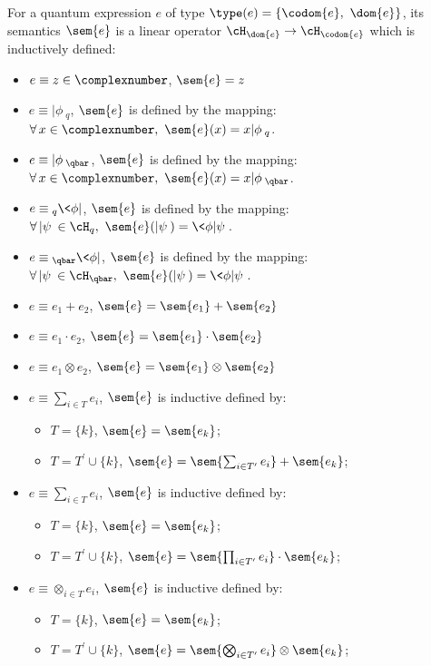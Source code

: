     \begin{definition}
        For a quantum expression $e$ of type $\type(e) = \{\codom{e},\ \dom{e}\}$, its semantics $\sem{e}$ is a linear operator $\cH_{\dom{e}}\rightarrow\cH_{\codom{e}}$ which is inductively defined:
        \begin{itemize}
            \item $e\equiv z\in\complexnumber$, $\sem{e} = z$
            \item $e\equiv |\phi\>_q$, $\sem{e}$ is defined by the mapping: $\forall\,x\in\complexnumber,\ \sem{e}(x) = x|\phi\>_q$.
            \item $e\equiv |\phi\>_{\qbar}$, $\sem{e}$ is defined by the mapping: $\forall\,x\in\complexnumber,\ \sem{e}(x) = x|\phi\>_{\qbar}$.
            \item $e\equiv {}_q\<\phi|$, $\sem{e}$ is defined by the mapping: $\forall\,|\psi\>\in\cH_{q},\ \sem{e}(|\psi\>) = \<\phi|\psi\>$.
            \item $e\equiv {}_{\qbar}\<\phi|$, $\sem{e}$ is defined by the mapping: $\forall\,|\psi\>\in\cH_{\qbar},\ \sem{e}(|\psi\>) = \<\phi|\psi\>$.
            \item $e\equiv e_1+e_2$, $\sem{e} = \sem{e_1}+\sem{e_2}$
            \item $e\equiv e_1\cdot e_2$, $\sem{e} = \sem{e_1}\cdot\sem{e_2}$
            \item $e\equiv e_1\otimes e_2$, $\sem{e} = \sem{e_1}\otimes\sem{e_2}$
            \item $e\equiv\sum_{i\in T} e_i$,  $\sem{e}$ is inductive defined by:
            \begin{itemize}
                \item $T = \{k\}$, $\sem{e} = \sem{e_k}$;
                \item $T = T^\prime\cup\{k\}$, $\sem{e} = \sem{\sum_{i\in T^\prime}e_i} + \sem{e_k}$;
            \end{itemize}
            \item $e\equiv\sum_{i\in T} e_i$,  $\sem{e}$ is inductive defined by:
            \begin{itemize}
                \item $T = \{k\}$, $\sem{e} = \sem{e_k}$;
                \item $T = T^\prime\cup\{k\}$, $\sem{e} = \sem{\prod_{i\in T^\prime}e_i} \cdot \sem{e_k}$;
            \end{itemize}
            \item $e\equiv\otimes_{i\in T} e_i$,  $\sem{e}$ is inductive defined by:
            \begin{itemize}
                \item $T = \{k\}$, $\sem{e} = \sem{e_k}$;
                \item $T = T^\prime\cup\{k\}$, $\sem{e} = \sem{\bigotimes_{i\in T^\prime}e_i} \otimes \sem{e_k}$;
            \end{itemize}
        \end{itemize}
    \end{definition}
